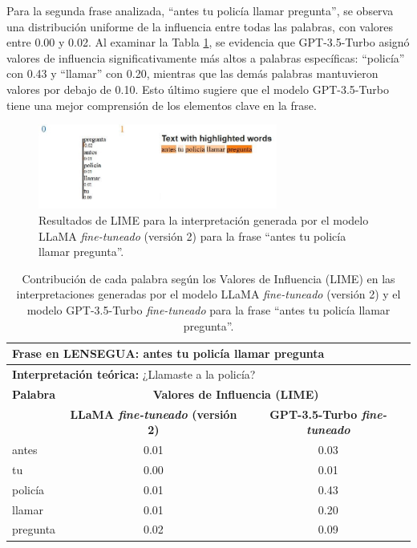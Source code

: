 Para la segunda frase analizada, “antes tu policía llamar pregunta”, se observa una distribución uniforme de la influencia entre todas las palabras, con valores entre 0.00 y 0.02. Al examinar la Tabla \ref{tab:LIME2-2}, se evidencia que GPT-3.5-Turbo asignó valores de influencia significativamente más altos a palabras específicas: “policía” con 0.43 y “llamar” con 0.20, mientras que las demás palabras mantuvieron valores por debajo de 0.10. Esto último sugiere que el modelo GPT-3.5-Turbo tiene una mejor comprensión de los elementos clave en la frase.

\begin{figure}[H]
\centering
    \includegraphics[width=0.7\textwidth]{figuras/Oracion2.JPG}
    \caption{Resultados de LIME para la interpretación generada por el modelo LLaMA \textit{fine-tuneado} (versión 2) para la frase “antes tu policía llamar pregunta”.}
    \label{fig:LIME2-F2}
\end{figure}

\vspace{0.5cm}
\begin{table}[H]
\centering
    \begin{tabular}{|l|c|c|}
        \hline
        \multicolumn{3}{|l|}{\textbf{Frase en LENSEGUA:} antes tu policía llamar pregunta} \\ \hline
        \multicolumn{3}{|l|}{\textbf{Interpretación teórica:} ¿Llamaste a la policía?} \\ \hline \hline
        
        \textbf{Palabra} & \multicolumn{2}{c|}{\textbf{Valores de Influencia (LIME)}} \\ 
        \cline{2-3}
        & \textbf{LLaMA \textit{fine-tuneado} (versión 2)} & \textbf{GPT-3.5-Turbo \textit{fine-tuneado}} \\
         
        \hline
        antes & 0.01 & 0.03 \\
        \hline
        tu & 0.00 & 0.01 \\
        \hline
        policía & 0.01  & 0.43 \\
        \hline
        llamar & 0.01  & 0.20 \\
        \hline
        pregunta & 0.02  & 0.09 \\
        \hline
    \end{tabular}
\caption{Contribución de cada palabra según los Valores de Influencia (LIME) en las interpretaciones generadas por el modelo LLaMA \textit{fine-tuneado} (versión 2) y el modelo GPT-3.5-Turbo \textit{fine-tuneado} para la frase “antes tu policía llamar pregunta”.}
\label{tab:LIME2-2}
\end{table}

